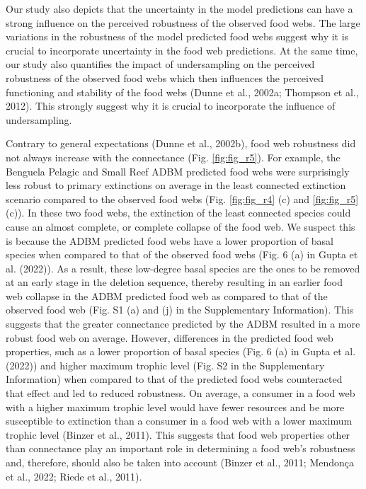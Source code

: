 \documentclass{article}
\begin{document}
Our study also depicts that the uncertainty in the model predictions can
have a strong influence on the perceived robustness of the observed food
webs. The large variations in the robustness of the model predicted food
webs suggest why it is crucial to incorporate uncertainty in the food
web predictions. At the same time, our study also quantifies the impact
of undersampling on the perceived robustness of the observed food webs
which then influences the perceived functioning and stability of the
food webs (Dunne et al., 2002a; Thompson et al., 2012). This strongly
suggest why it is crucial to incorporate the influence of undersampling.

Contrary to general expectations (Dunne et al., 2002b), food web
robustness did not always increase with the connectance (Fig.
\ref{fig:fig_r5}). For example, the Benguela Pelagic and Small Reef ADBM
predicted food webs were surprisingly less robust to primary extinctions
on average in the least connected extinction scenario compared to the
observed food webs (Fig. \ref{fig:fig_r4} (c) and \ref{fig:fig_r5} (c)).
In these two food webs, the extinction of the least connected species
could cause an almost complete, or complete collapse of the food web. We
suspect this is because the ADBM predicted food webs have a lower
proportion of basal species when compared to that of the observed food
webs (Fig. 6 (a) in Gupta et al. (2022)). As a result, these low-degree
basal species are the ones to be removed at an early stage in the
deletion sequence, thereby resulting in an earlier food web collapse in
the ADBM predicted food web as compared to that of the observed food web
(Fig. S1 (a) and (j) in the Supplementary Information). This suggests
that the greater connectance predicted by the ADBM resulted in a more
robust food web on average. However, differences in the predicted food
web properties, such as a lower proportion of basal species (Fig. 6 (a)
in Gupta et al. (2022)) and higher maximum trophic level (Fig. S2 in the
Supplementary Information) when compared to that of the predicted food
webs counteracted that effect and led to reduced robustness. On average,
a consumer in a food web with a higher maximum trophic level would have
fewer resources and be more susceptible to extinction than a consumer in
a food web with a lower maximum trophic level (Binzer et al., 2011).
This suggests that food web properties other than connectance play an
important role in determining a food web's robustness and, therefore,
should also be taken into account (Binzer et al., 2011; Mendonça et al.,
2022; Riede et al., 2011).
\end{document}
